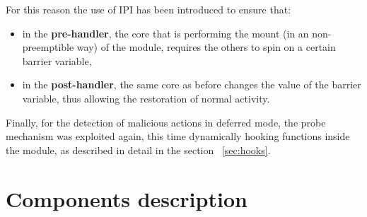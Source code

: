 \documentclass{article}
\begin{document}
	For this reason the use of IPI has been introduced to ensure that:
	\begin{itemize}
		\item in the \textbf{pre-handler}, the core that is performing the mount (in an non-preemptible way) of the
		module, requires the others to spin on a certain barrier variable,
		\item in the \textbf{post-handler}, the same core as before changes the value of the barrier variable, thus
		allowing the restoration of normal activity.
	\end{itemize}

	Finally, for the detection of malicious actions in deferred mode, the probe mechanism was exploited again, this
	time dynamically hooking functions inside the module, as described in detail in the section ~\ref{sec:hooks}.

	\section{Components description}

	
	
\end{document}
